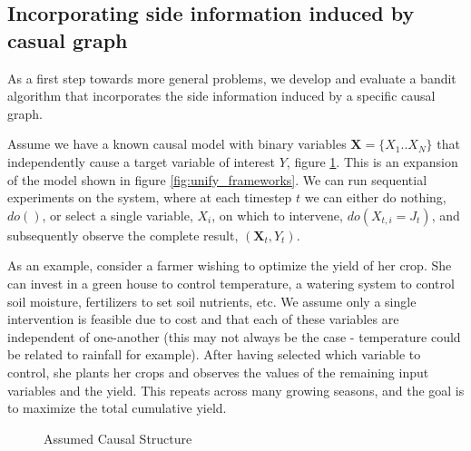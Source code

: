 \documentclass[11pt,a4paper]{article}
\begin{document}
\subsection{Incorporating side information induced by casual graph}

As a first step towards more general problems, we develop and evaluate a bandit algorithm that incorporates the side information induced by a specific causal graph. 

Assume we have a known causal model with binary variables $\boldsymbol{X} = \{X_{1}..X_{N}\}$ that independently cause a target variable of interest $Y$, figure \ref{fig:causalStructure}. This is an expansion of the model shown in figure \ref{fig:unify_frameworks}. We can run sequential experiments on the system, where at each timestep $t$ we can either do nothing, $do()$, or select a single variable, $X_i$, on which to intervene, $do(X_{t,i} = J_t)$, and subsequently observe the complete result, $(\boldsymbol{X}_{t},Y_{t})$. 

As an example, consider a farmer wishing to optimize the yield of her crop. She can invest in a green house to control temperature, a watering system to control soil moisture, fertilizers to set soil nutrients, etc. We assume only a single intervention is feasible due to cost and that each of these variables are independent of one-another (this may not always be the case - temperature could be related to rainfall for example). After having selected which variable to control, she plants her crops and observes the values of the remaining input variables and the yield. This repeats across many growing seasons, and the goal is to maximize the total cumulative yield.

\begin{figure}[h]
\centering
\caption{Assumed Causal Structure}
\label{fig:causalStructure}
\end{figure}
\end{document}

